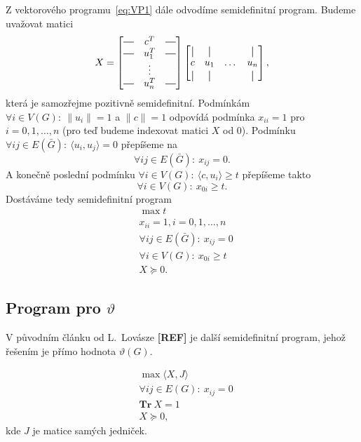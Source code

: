 Z vektorového programu~\ref{eq:VP1} dále odvodíme semidefinitní program. Budeme uvažovat matici
$$
    X =
    \begin{bmatrix}
        \horzbar & c^T    & \horzbar \\
        \horzbar & u_1^T  & \horzbar \\
                 & \vdots &          \\
        \horzbar & u_n^T  & \horzbar
    \end{bmatrix}
    \begin{bmatrix}
        \vertbar & \vertbar &       & \vertbar \\
        c        & u_1      & \dots & u_n      \\
        \vertbar & \vertbar &       & \vertbar \\
    \end{bmatrix},
$$
která je samozřejme pozitivně semidefinitní.
Podmínkám $\forall i \in V(G):\ \| u_i \| = 1$ a $\|c\|=1$ odpovídá podmínka $x_{ii} = 1$ pro $i = 0, 1, \dots, n$ (pro teď budeme indexovat matici $X$ od $0$). Podmínku $\forall ij \in E(\bar{G}):\ \langle u_i, u_j \rangle = 0$ přepíšeme na
$$
    \forall ij \in E(\bar{G}):\ x_{ij} = 0.
$$
A konečně poslední podmínku $\forall i \in V(G):\ \langle c, u_i \rangle \geq t$ přepíšeme takto
$$
    \forall i \in V(G):\ x_{0i} \geq t.
$$
Dostáváme tedy semidefinitní program
\begin{equation}\tag{SDP1}
    \begin{split}
        &\max t \\
        &x_{ii} = 1, i = 0, 1, \dots, n \\
        &\forall ij \in E(\bar{G}):\ x_{ij} = 0 \\
        &\forall i \in V(G):\ x_{0i}  \geq t \\
        &X \succeq 0.
    \end{split}
    \label{eq:SDP1}
\end{equation}


\subsection*{Program pro $\vartheta$}

V původním článku od L.~Lovásze \textbf{[REF]} je další semidefinitní program, jehož řešením je přímo hodnota $\vartheta(G)$.

\begin{equation}\tag{SDP2}
    \begin{split}
        &\max \langle X, J \rangle \\
        &\forall ij \in E(G):\ x_{ij} = 0 \\
        &\textbf{Tr}\ X = 1 \\
        &X \succeq 0,
    \end{split}
    \label{eq:SDP2}
\end{equation}
kde $J$ je matice samých jedniček.


